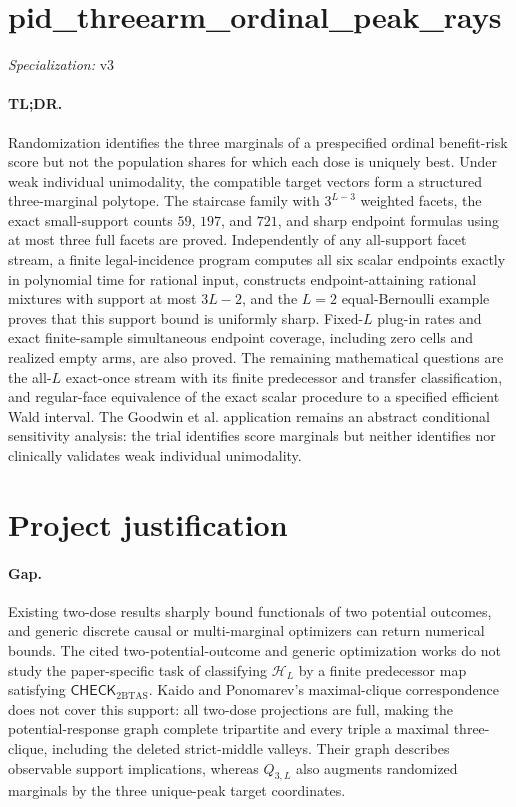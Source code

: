 \documentclass{article}
\begin{document}
\sloppy

\section*{pid\_\allowbreak{}threearm\_\allowbreak{}ordinal\_\allowbreak{}peak\_\allowbreak{}rays}

\noindent\textit{Specialization:} v3\par

\paragraph{TL;DR.} Randomization identifies the three marginals of a prespecified ordinal benefit-risk score but not the population shares for which each dose is uniquely best.  Under weak individual unimodality, the compatible target vectors form a structured three-marginal polytope.  The staircase family with \(3^{L-3}\) weighted facets, the exact small-support counts \(59\), \(197\), and \(721\), and sharp endpoint formulas using at most three full facets are proved.  Independently of any all-support facet stream, a finite legal-incidence program computes all six scalar endpoints exactly in polynomial time for rational input, constructs endpoint-attaining rational mixtures with support at most \(3L-2\), and the \(L=2\) equal-Bernoulli example proves that this support bound is uniformly sharp.  Fixed-\(L\) plug-in rates and exact finite-sample simultaneous endpoint coverage, including zero cells and realized empty arms, are also proved.  The remaining mathematical questions are the all-\(L\) exact-once stream with its finite predecessor and transfer classification, and regular-face equivalence of the exact scalar procedure to a specified efficient Wald interval.  The Goodwin et al. application remains an abstract conditional sensitivity analysis: the trial identifies score marginals but neither identifies nor clinically validates weak individual unimodality.

\section{Project justification}

\paragraph{Gap.} Existing two-dose results sharply bound functionals of two potential outcomes, and generic discrete causal or multi-marginal optimizers can return numerical bounds.  The cited two-potential-outcome and generic optimization works do not study the paper-specific task of classifying \(\mathcal H_L\) by a finite predecessor map satisfying \(\mathsf{CHECK}_{2\mathrm{BTAS}}\).  Kaido and Ponomarev's maximal-clique correspondence does not cover this support: all two-dose projections are full, making the potential-response graph complete tripartite and every triple a maximal three-clique, including the deleted strict-middle valleys.  Their graph describes observable support implications, whereas \(Q_{3,L}\) also augments randomized marginals by the three unique-peak target coordinates.
\end{document}
